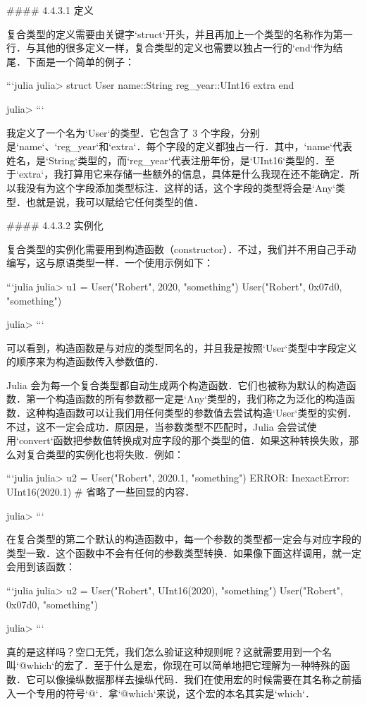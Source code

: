 #### 4.4.3.1 定义

复合类型的定义需要由关键字`struct`开头，并且再加上一个类型的名称作为第一行．与其他的很多定义一样，复合类型的定义也需要以独占一行的`end`作为结尾．下面是一个简单的例子：

```julia
julia> struct User
           name::String
           reg_year::UInt16
           extra
       end

julia> 
```

我定义了一个名为`User`的类型．它包含了 3 个字段，分别是`name`、`reg_year`和`extra`．每个字段的定义都独占一行．其中，`name`代表姓名，是`String`类型的，而`reg_year`代表注册年份，是`UInt16`类型的．至于`extra`，我打算用它来存储一些额外的信息，具体是什么我现在还不能确定．所以我没有为这个字段添加类型标注．这样的话，这个字段的类型将会是`Any`类型．也就是说，我可以赋给它任何类型的值．

#### 4.4.3.2 实例化

复合类型的实例化需要用到构造函数（constructor）．不过，我们并不用自己手动编写，这与原语类型一样．一个使用示例如下：

```julia
julia> u1 = User("Robert", 2020, "something")
User("Robert", 0x07d0, "something")

julia> 
```

可以看到，构造函数是与对应的类型同名的，并且我是按照`User`类型中字段定义的顺序来为构造函数传入参数值的．

Julia 会为每一个复合类型都自动生成两个构造函数．它们也被称为默认的构造函数．第一个构造函数的所有参数都一定是`Any`类型的，我们称之为泛化的构造函数．这种构造函数可以让我们用任何类型的参数值去尝试构造`User`类型的实例．不过，这不一定会成功．原因是，当参数类型不匹配时，Julia 会尝试使用`convert`函数把参数值转换成对应字段的那个类型的值．如果这种转换失败，那么对复合类型的实例化也将失败．例如：

```julia
julia> u2 = User("Robert", 2020.1, "something")
ERROR: InexactError: UInt16(2020.1)
# 省略了一些回显的内容．

julia> 
```

在复合类型的第二个默认的构造函数中，每一个参数的类型都一定会与对应字段的类型一致．这个函数中不会有任何的参数类型转换．如果像下面这样调用，就一定会用到该函数：

```julia 
julia> u2 = User("Robert", UInt16(2020), "something")
User("Robert", 0x07d0, "something")

julia> 
```

真的是这样吗？空口无凭，我们怎么验证这种规则呢？这就需要用到一个名叫`@which`的宏了．至于什么是宏，你现在可以简单地把它理解为一种特殊的函数．它可以像操纵数据那样去操纵代码．我们在使用宏的时候需要在其名称之前插入一个专用的符号`@`．拿`@which`来说，这个宏的本名其实是`which`．

